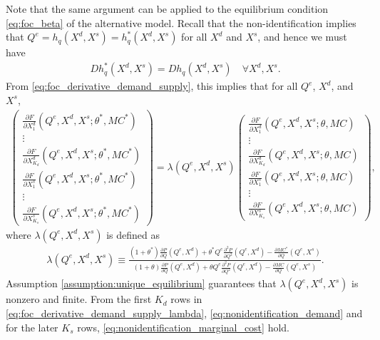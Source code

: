 \documentclass[11pt, a4paper]{article}
\theoremstyle{remark}
\begin{document}
Note that the same argument can be applied to the equilibrium condition \eqref{eq:foc_beta} of the alternative model.
Recall that the non-identification implies that $Q^e = h_q(X^{d}, X^{s}) = h_q^{*}(X^{d}, X^{s})$ for all $X^{d}$ and $X^{s}$, and hence we must have
\begin{align}
    Dh_q^{*}(X^{d}, X^{s}) = Dh_q(X^{d}, X^{s}) \quad \forall X^{d}, X^{s}. \label{eq:observale_equivalence_derivative}
\end{align}
From \eqref{eq:foc_derivative_demand_supply}, this implies that for all $Q^e$, $X^{d}$, and $X^{s}$,
\begin{align}
    \begin{pmatrix}
        \frac{\partial F}{\partial X^{d}_{1}}(Q^e, X^{d}, X^{s}; \theta^{*}, MC^{*})\\
        \vdots \\
        \frac{\partial F}{\partial X^{d}_{K_d}}(Q^e, X^{d}, X^{s}; \theta^{*}, MC^{*})\\
        \frac{\partial F}{\partial X^{s}_{1}}(Q^e, X^{d}, X^{s}; \theta^{*}, MC^{*})\\
        \vdots \\
        \frac{\partial F}{\partial X^{s}_{K_s}}(Q^e, X^{d}, X^{s}; \theta^{*}, MC^{*})
    \end{pmatrix}
    = \lambda(Q^e, X^{d}, X^{s})
    \begin{pmatrix}
        \frac{\partial F}{\partial X^{d}_{1}}(Q^e, X^{d}, X^{s}; \theta, MC)\\
        \vdots \\
        \frac{\partial F}{\partial X^{d}_{K_d}}(Q^e, X^{d}, X^{s}; \theta, MC)\\
        \frac{\partial F}{\partial X^{s}_{1}}(Q^e, X^{d}, X^{s}; \theta, MC)\\
        \vdots \\
        \frac{\partial F}{\partial X^{s}_{K_s}}(Q^e, X^{d}, X^{s}; \theta, MC)
    \end{pmatrix},\label{eq:foc_derivative_demand_supply_lambda}
\end{align}
where $\lambda(Q^e, X^{d}, X^{s})$ is defined as
\begin{align}
    \lambda(Q^e, X^{d}, X^{s}) \equiv \frac{(1+\theta^{*})\frac{\partial P}{\partial Q}(Q^e, X^{d}) + \theta^{*} Q^e\frac{\partial^2 P}{\partial Q^2}(Q^e, X^{d}) - \frac{\partial MC^{*}}{\partial Q}(Q^e, X^{s})}{(1+\theta)\frac{\partial P}{\partial Q}(Q^e, X^{d}) + \theta Q^e\frac{\partial^2 P}{\partial Q^2}(Q^e, X^{d}) - \frac{\partial MC}{\partial Q}(Q^e, X^{s})}.
\end{align}
Assumption \ref{assumption:unique_equilibrium} guarantees that $\lambda(Q^e, X^{d}, X^{s})$ is nonzero and finite.
From the first $K_d$ rows in \eqref{eq:foc_derivative_demand_supply_lambda}, \eqref{eq:nonidentification_demand} and for the later $K_s$ rows, \eqref{eq:nonidentification_marginal_cost} hold.
\end{document}
